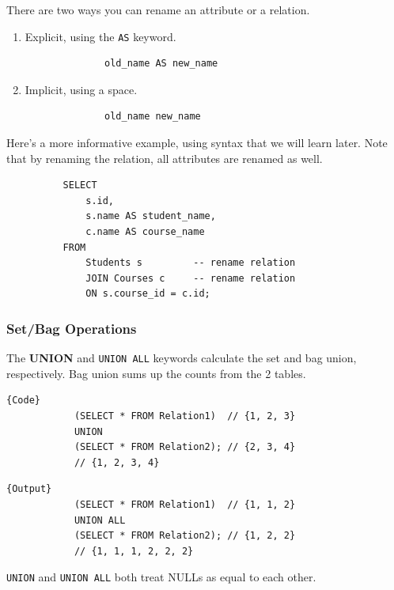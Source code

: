 \documentclass{article}
\begin{document}
      \begin{definition}[Renaming]
        There are two ways you can rename an attribute or a relation. 
        \begin{enumerate}
          \item Explicit, using the \texttt{AS} keyword. 
            \begin{lstlisting}
              old_name AS new_name
            \end{lstlisting}
          \item Implicit, using a space. 
            \begin{lstlisting}
              old_name new_name
            \end{lstlisting}
        \end{enumerate}
      \end{definition}

      \begin{example}
        Here's a more informative example, using syntax that we will learn later. Note that by renaming the relation, all attributes are renamed as well. 
        \begin{lstlisting}
          SELECT
              s.id, 
              s.name AS student_name,
              c.name AS course_name
          FROM 
              Students s         -- rename relation
              JOIN Courses c     -- rename relation
              ON s.course_id = c.id; 
        \end{lstlisting}
      \end{example}

    \subsubsection{Set/Bag Operations}

      \begin{definition}[Union]
        The \textbf{UNION} and \texttt{UNION ALL} keywords calculate the set and bag union, respectively. Bag union sums up the counts from the 2 tables. 

        \noindent\begin{minipage}{.5\textwidth}
          \begin{lstlisting}[]{Code}
            (SELECT * FROM Relation1)  // {1, 2, 3}
            UNION 
            (SELECT * FROM Relation2); // {2, 3, 4}
            // {1, 2, 3, 4}
          \end{lstlisting}
          \end{minipage}
          \hfill
          \begin{minipage}{.49\textwidth}
          \begin{lstlisting}[]{Output}
            (SELECT * FROM Relation1)  // {1, 1, 2}
            UNION ALL 
            (SELECT * FROM Relation2); // {1, 2, 2}
            // {1, 1, 1, 2, 2, 2}
          \end{lstlisting}
        \end{minipage} 
        \texttt{UNION} and \texttt{UNION ALL} both treat NULLs as equal to each other. 
      \end{definition} 
\end{document}
